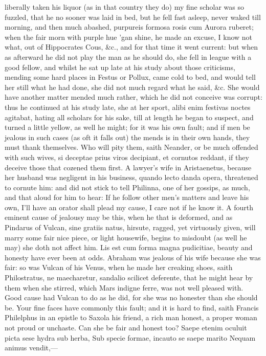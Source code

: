 {liberally taken his liquor (as in that country they do) my fine scholar
was so fuzzled, that he no sooner was laid in bed, but he fell fast
asleep, never waked till morning, and then much abashed, purpureis
formosa rosis cum Aurora ruberet; when the fair morn with purple hue
'gan shine, he made an excuse, I know not what, out of Hippocrates
Cous, \&c., and for that time it went current: but when as afterward he
did not play the man as he should do, she fell in league with a good
fellow, and whilst he sat up late at his study about those criticisms,
mending some hard places in Festus or Pollux, came cold to bed, and
would tell her still what he had done, she did not much regard what he
said, \&c. She would have another matter mended much rather, which
he did not conceive was corrupt: thus he continued at his study late,
she at her sport, alibi enim festivas noctes agitabat, hating all
scholars for his sake, till at length he began to suspect, and turned a
little yellow, as well he might; for it was his own fault; and if men
be jealous in such cases (as oft it falls out) the mends is in
their own hands, they must thank themselves. Who will pity them, saith
Neander, or be much offended with such wives, si deceptae prius viros
decipiant, et cornutos reddant, if they deceive those that cozened them
first. A lawyer's wife in Aristaenetus, because her husband was
negligent in his business, quando lecto danda opera, threatened to
cornute him: and did not stick to tell Philinna, one of her gossips, as
much, and that aloud for him to hear: If he follow other men's matters
and leave his own, I'll have an orator shall plead my cause, I care not
if he know it.
A fourth eminent cause of jealousy may be this, when he that is
deformed, and as Pindarus of Vulcan, sine gratiis natus, hirsute,
ragged, yet virtuously given, will marry some fair nice piece, or light
housewife, begins to misdoubt (as well he may) she doth not affect him.
Lis est cum forma magna pudicitiae, beauty and honesty have ever
been at odds. Abraham was jealous of his wife because she was fair: so
was Vulcan of his Venus, when he made her creaking shoes, saith
Philostratus, ne maecharetur, sandalio scilicet deferente, that
he might hear by them when she stirred, which Mars indigne ferre,
was not well pleased with. Good cause had Vulcan to do as he did,
for she was no honester than she should be. Your fine faces have
commonly this fault; and it is hard to find, saith Francis Philelphus
in an epistle to Saxola his friend, a rich man honest, a proper woman
not proud or unchaste. Can she be fair and honest too?
Saepe etenim oculuit picta sese hydra sub herba,
Sub specie formae, incauto se saepe marito
Nequam animus vendit,---

}
